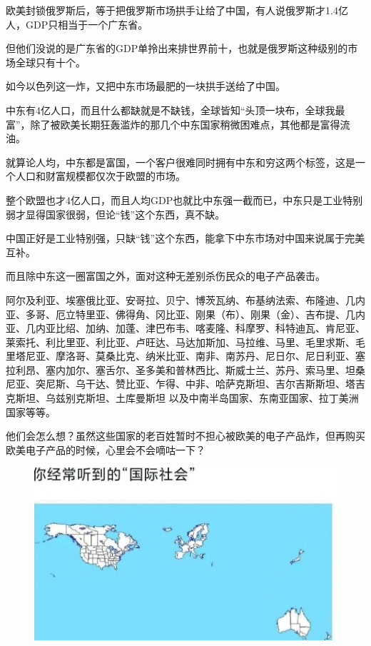 \documentclass[UTF8,11pt,oneside]{ctexart}
\begin{document}

欧美封锁俄罗斯后，等于把俄罗斯市场拱手让给了中国，有人说俄罗斯才1.4亿人，GDP只相当于一个广东省。

但他们没说的是广东省的GDP单拎出来排世界前十，也就是俄罗斯这种级别的市场全球只有十个。

如今以色列这一炸，又把中东市场最肥的一块拱手送给了中国。

中东有4亿人口，而且什么都缺就是不缺钱，全球皆知“头顶一块布，全球我最富”，除了被欧美长期狂轰滥炸的那几个中东国家稍微困难点，其他都是富得流油。

就算论人均，中东都是富国，一个客户很难同时拥有中东和穷这两个标签，这是一个人口和财富规模都仅次于欧盟的市场。

整个欧盟也才4亿人口，而且人均GDP也就比中东强一截而已，中东只是工业特别弱才显得国家很弱，但论“钱”这个东西，真不缺。

中国正好是工业特别强，只缺“钱”这个东西，能拿下中东市场对中国来说属于完美互补。

而且除中东这一圈富国之外，面对这种无差别杀伤民众的电子产品袭击。

阿尔及利亚、埃塞俄比亚、安哥拉、贝宁、博茨瓦纳、布基纳法索、布隆迪、几内亚、多哥、厄立特里亚、佛得角、冈比亚、刚果（布）、刚果（金）、吉布提、几内亚、几内亚比绍、加纳、加蓬、津巴布韦、喀麦隆、科摩罗、科特迪瓦、肯尼亚、莱索托、利比里亚、利比亚、卢旺达、马达加斯加、马拉维、马里、毛里求斯、毛里塔尼亚、摩洛哥、莫桑比克、纳米比亚、南非、南苏丹、尼日尔、尼日利亚、塞拉利昂、塞内加尔、塞舌尔、圣多美和普林西比、斯威士兰、苏丹、索马里、坦桑尼亚、突尼斯、乌干达、赞比亚、乍得、中非、哈萨克斯坦、吉尔吉斯斯坦、塔吉克斯坦、乌兹别克斯坦、土库曼斯坦 以及中南半岛国家、东南亚国家、拉丁美洲国家等等。

他们会怎么想？虽然这些国家的老百姓暂时不担心被欧美的电子产品炸，但再购买欧美电子产品的时候，心里会不会嘀咕一下？


\begin{figure}[H]
    \centering
    \includegraphics[width=12cm]{2024-09-21-006.jpg}
\end{figure}
\end{document}
